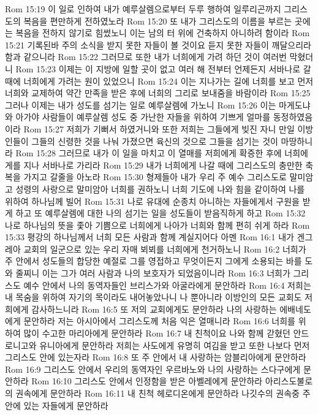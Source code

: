 Rom 15:19  이 일로 인하여 내가 예루살렘으로부터 두루 행하여 일루리곤까지 그리스도의 복음을 편만하게 전하였노라
Rom 15:20  또 내가 그리스도의 이름을 부르는 곳에는 복음을 전하지 않기로 힘썼노니 이는 남의 터 위에 건축하지 아니하려 함이라
Rom 15:21  기록된바 주의 소식을 받지 못한 자들이 볼 것이요 듣지 못한 자들이 깨달으리라 함과 같으니라
Rom 15:22  그러므로 또한 내가 너희에게 가려 하던 것이 여러번 막혔더니
Rom 15:23  이제는 이 지방에 일할 곳이 없고 여러 해 전부터 언제든지 서바나로 갈 때에 너희에게 가려는 원이 있었으니
Rom 15:24  이는 지나가는 길에 너희를 보고 먼저 너희와 교제하여 약간 만족을 받은 후에 너희의 그리로 보내줌을 바람이라
Rom 15:25  그러나 이제는 내가 성도를 섬기는 일로 예루살렘에 가노니
Rom 15:26  이는 마게도냐와 아가야 사람들이 예루살렘 성도 중 가난한 자들을 위하여 기쁘게 얼마를 동정하였음이라
Rom 15:27  저희가 기뻐서 하였거니와 또한 저희는 그들에게 빚진 자니 만일 이방인들이 그들의 신령한 것을 나눠 가졌으면 육신의 것으로 그들을 섬기는 것이 마땅하니라
Rom 15:28  그러므로 내가 이 일을 마치고 이 열매를 저희에게 확증한 후에 너희에게를 지나 서바나로 가리라
Rom 15:29  내가 너희에게 나갈 때에 그리스도의 충만한 축복을 가지고 갈줄을 아노라
Rom 15:30  형제들아 내가 우리 주 예수 그리스도로 말미암고 성령의 사랑으로 말미암아 너희를 권하노니 너희 기도에 나와 힘을 같이하여 나를 위하여 하나님께 빌어
Rom 15:31  나로 유대에 순종치 아니하는 자들에게서 구원을 받게 하고 또 예루살렘에 대한 나의 섬기는 일을 성도들이 받음직하게 하고
Rom 15:32  나로 하나님의 뜻을 좇아 기쁨으로 너희에게 나아가 너희와 함께 편히 쉬게 하라
Rom 15:33  평강의 하나님께서 너희 모든 사람과 함께 계실지어다 아멘
Rom 16:1  내가 겐그레아 교회의 일군으로 있는 우리 자매 뵈뵈를 너희에게 천거하노니
Rom 16:2  너희가 주 안에서 성도들의 합당한 예절로 그를 영접하고 무엇이든지 그에게 소용되는 바를 도와 줄찌니 이는 그가 여러 사람과 나의 보호자가 되었음이니라
Rom 16:3  너희가 그리스도 예수 안에서 나의 동역자들인 브리스가와 아굴라에게 문안하라
Rom 16:4  저희는 내 목숨을 위하여 자기의 목이라도 내어놓았나니 나 뿐아니라 이방인의 모든 교회도 저희에게 감사하느니라
Rom 16:5  또 저의 교회에게도 문안하라 나의 사랑하는 에배네도에게 문안하라 저는 아시아에서 그리스도께 처음 익은 열매니라
Rom 16:6  너희를 위하여 많이 수고한 마리아에게 문안하라
Rom 16:7  내 친척이요 나와 함께 갇혔던 안드로니고와 유니아에게 문안하라 저희는 사도에게 유명히 여김을 받고 또한 나보다 먼저 그리스도 안에 있는자라
Rom 16:8  또 주 안에서 내 사랑하는 암블리아에게 문안하라
Rom 16:9  그리스도 안에서 우리의 동역자인 우르바노와 나의 사랑하는 스다구에게 문안하라
Rom 16:10  그리스도 안에서 인정함을 받은 아벨레에게 문안하라 아리스도불로의 권속에게 문안하라
Rom 16:11  내 친척 헤로디온에게 문안하라 나깃수의 권속중 주 안에 있는 자들에게 문안하라
